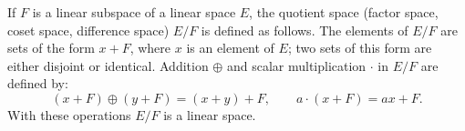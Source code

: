 If $F$ is a linear subspace of a linear space $E$, the quotient space (factor space, coset space, difference space) $E/F$ is defined as follows. The elements of $E/F$ are sets of the form $x + F$, where $x$ is an element of $E$; two sets of this form are either disjoint or identical. Addition $\oplus$ and scalar multiplication $\cdot$ in $E/F$ are defined by:
$$
(x + F) \oplus (y + F) = (x + y) + F, \qquad a \cdot (x + F) = a x + F.
$$
With these operations $E/F$ is a linear space.
